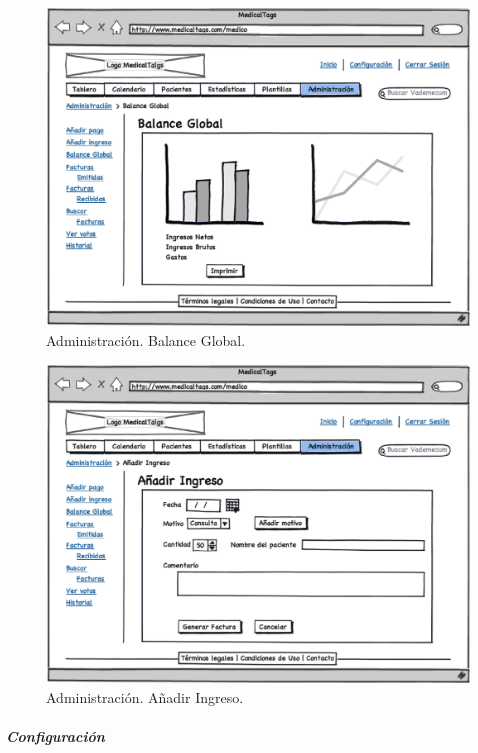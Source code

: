 		
		\begin{figure}[H]
		  \centering
		    \includegraphics[width=12cm]{img/eps/21_Administracion_Medico2.eps}
		  \caption{Administración. Balance Global.}
		  \label{fig:administracion_balance}
		\end{figure}
		
		\begin{figure}[H]
		  \centering
		    \includegraphics[width=12cm]{img/eps/22_Administracion_Medico1.eps}
		  \caption{Administración. Añadir Ingreso.}
		  \label{fig:administracion_ingreso}
		\end{figure}
				
		
		\subparagraph{Configuración} %
		\label{par:medico_configuracion}
		

